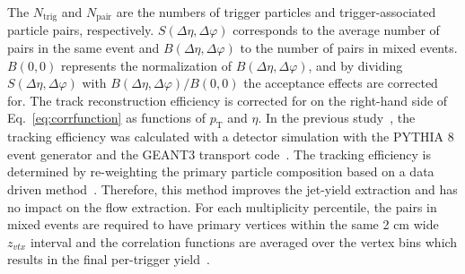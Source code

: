 The $N_\mathrm{trig}$ and $N_\mathrm{pair}$ are the numbers of trigger particles and trigger-associated particle pairs, respectively. $S(\Delta\eta, \Delta\varphi)$ corresponds to the average number of pairs in the same event and $B(\Delta\eta, \Delta\varphi)$ to the number of pairs in mixed events. 
$B (0,0)$ represents the normalization of $B(\Delta\eta, \Delta\varphi)$, and by dividing $S(\Delta\eta, \Delta\varphi)$ with $B(\Delta\eta, \Delta\varphi)/B (0,0)$ the acceptance effects are corrected for. The track reconstruction efficiency is corrected for on the right-hand side of Eq.~\ref{eq:corrfunction} as functions of $p_\mathrm{T}$ and $\eta$. 
In the previous study~\cite{ALICE:2021nir}, the tracking efficiency was calculated with a detector simulation with the PYTHIA 8 event generator and the GEANT3 transport code~\cite{Brun:1994aa}. The tracking efficiency is determined by re-weighting the primary particle composition based on a data driven method~\cite{ALICE:2018hza,ALICE:2018vuu}. Therefore, this method improves the jet-yield extraction and has no impact on the flow extraction.
For each multiplicity percentile, the pairs in mixed events are required to have primary vertices within the same 2 cm wide $z_{vtx}$ interval and the correlation functions are averaged over the vertex bins which results in the final per-trigger yield~\cite{KOPYLOV1974472:evtmixing,Adam:2016tsv}.


